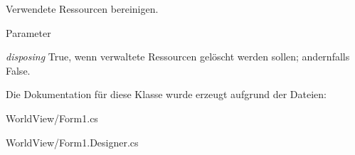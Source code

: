 Verwendete Ressourcen bereinigen. 


\begin{DoxyParams}{Parameter}
\item[{\em disposing}]True, wenn verwaltete Ressourcen gelöscht werden sollen; andernfalls False.\end{DoxyParams}


Die Dokumentation für diese Klasse wurde erzeugt aufgrund der Dateien:\begin{DoxyCompactItemize}
\item 
WorldView/Form1.cs\item 
WorldView/Form1.Designer.cs\end{DoxyCompactItemize}

